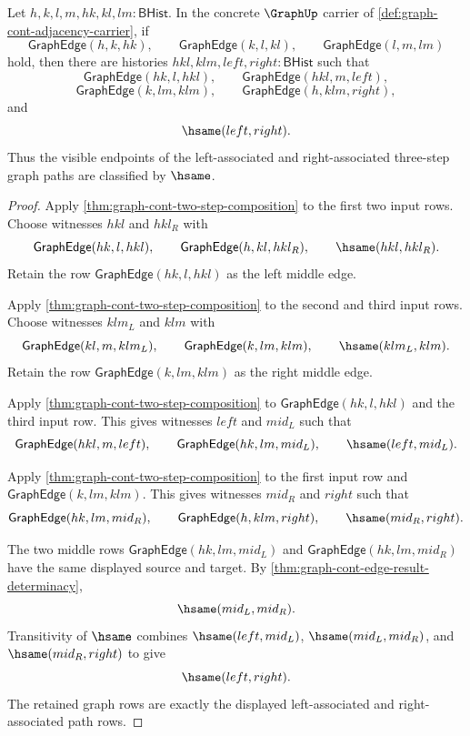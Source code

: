 \begin{theorem}
\label{thm:graph-cont-three-step-path-reassociation}
Let $h,k,l,m,hk,kl,lm:\mathsf{BHist}$. In the concrete $\GraphUp$ carrier of \autoref{def:graph-cont-adjacency-carrier}, if
$$
\mathsf{GraphEdge}(h,k,hk),\qquad
\mathsf{GraphEdge}(k,l,kl),\qquad
\mathsf{GraphEdge}(l,m,lm)
$$
hold, then there are histories $hkl,klm,left,right:\mathsf{BHist}$ such that
$$
\mathsf{GraphEdge}(hk,l,hkl),\qquad
\mathsf{GraphEdge}(hkl,m,left),
$$
$$
\mathsf{GraphEdge}(k,lm,klm),\qquad
\mathsf{GraphEdge}(h,klm,right),
$$
and
$$
\hsame(left,right).
$$
Thus the visible endpoints of the left-associated and right-associated three-step graph paths are classified by $\hsame$.
\end{theorem}
\begin{proof}
Apply \autoref{thm:graph-cont-two-step-composition} to the first two input rows. Choose witnesses $hkl$ and $hkl_R$ with
$$
\mathsf{GraphEdge}(hk,l,hkl),\qquad
\mathsf{GraphEdge}(h,kl,hkl_R),\qquad
\hsame(hkl,hkl_R).
$$
Retain the row $\mathsf{GraphEdge}(hk,l,hkl)$ as the left middle edge.

Apply \autoref{thm:graph-cont-two-step-composition} to the second and third input rows. Choose witnesses $klm_L$ and $klm$ with
$$
\mathsf{GraphEdge}(kl,m,klm_L),\qquad
\mathsf{GraphEdge}(k,lm,klm),\qquad
\hsame(klm_L,klm).
$$
Retain the row $\mathsf{GraphEdge}(k,lm,klm)$ as the right middle edge.

Apply \autoref{thm:graph-cont-two-step-composition} to $\mathsf{GraphEdge}(hk,l,hkl)$ and the third input row. This gives witnesses $left$ and $mid_L$ such that
$$
\mathsf{GraphEdge}(hkl,m,left),\qquad
\mathsf{GraphEdge}(hk,lm,mid_L),\qquad
\hsame(left,mid_L).
$$

Apply \autoref{thm:graph-cont-two-step-composition} to the first input row and $\mathsf{GraphEdge}(k,lm,klm)$. This gives witnesses $mid_R$ and $right$ such that
$$
\mathsf{GraphEdge}(hk,lm,mid_R),\qquad
\mathsf{GraphEdge}(h,klm,right),\qquad
\hsame(mid_R,right).
$$

The two middle rows $\mathsf{GraphEdge}(hk,lm,mid_L)$ and $\mathsf{GraphEdge}(hk,lm,mid_R)$ have the same displayed source and target. By \autoref{thm:graph-cont-edge-result-determinacy},
$$
\hsame(mid_L,mid_R).
$$
Transitivity of $\hsame$ combines $\hsame(left,mid_L)$, $\hsame(mid_L,mid_R)$, and $\hsame(mid_R,right)$ to give
$$
\hsame(left,right).
$$
The retained graph rows are exactly the displayed left-associated and right-associated path rows.
\end{proof}

